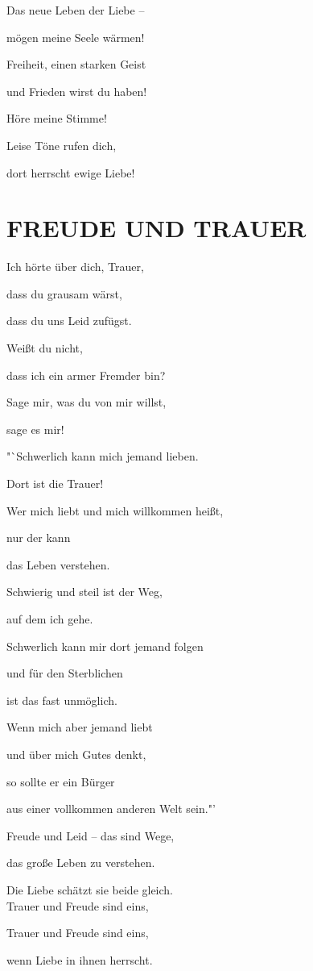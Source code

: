 \documentclass[11pt,a5paper,twoside]{article}
\begin{document}
Das neue Leben der Liebe -- 

mögen meine Seele wärmen! 

Freiheit, einen starken Geist 

und Frieden wirst du haben! 

Höre meine Stimme! 

Leise Töne rufen dich,

dort herrscht ewige Liebe!

\section[Freude und Trauer]{FREUDE UND TRAUER}

Ich hörte über dich, Trauer, 

dass du grausam wärst, 

dass du uns Leid zufügst. 

Weißt du nicht,

dass ich ein armer Fremder bin? 

Sage mir, was du von mir willst, 

sage es mir!

"`Schwerlich kann mich jemand lieben. 

Dort ist die Trauer!

Wer mich liebt und mich willkommen heißt,

nur der kann

das Leben verstehen. 

Schwierig und steil ist der Weg, 

auf dem ich gehe. 

Schwerlich kann mir dort jemand folgen 

und für den Sterblichen 

ist das fast unmöglich. 

Wenn mich aber jemand liebt


und über mich Gutes denkt,

so sollte er ein Bürger 

aus einer vollkommen anderen Welt sein."'

Freude und Leid -- das sind Wege, 

das große Leben zu verstehen. 

Die Liebe schätzt sie beide gleich.\\

Trauer und Freude sind eins,

Trauer und Freude sind eins,
 
wenn Liebe in ihnen herrscht.
\end{document}
